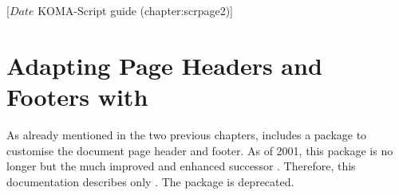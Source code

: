 %
%
%
%
%
%
%
%
% 
%
%
%
%

                 [$Date$
                  KOMA-Script guide (chapter:scrpage2)]



\chapter{Adapting Page Headers and Footers with }

%
%
As already mentioned in the two previous chapters, {\KOMAScript} includes a
package to customise the document page header and footer.  As of 2001, this
package is no longer  but the much
improved and enhanced successor .  Therefore, this
documentation describes only .  The package
 is deprecated.


